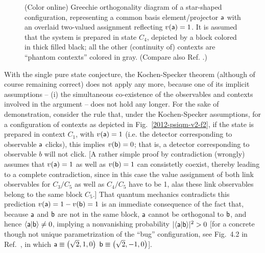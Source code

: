 \documentclass[%
  preprint,
 showpacs,
 showkeys,
 preprintnumbers,
 amsmath,amssymb,
 aps,
   pra,
  longbibliography,
 ]{revtex4-1}
\begin{document}
\begin{figure}[h]
\begin{center}
\end{center}
\caption{(Color online)
Greechie orthogonality diagram of a star-shaped configuration,
representing a common basis element/projector ${\textsf a}$ with an overlaid two-valued assignment reflecting $v({\textsf a})=1$.
It is assumed that the system is prepared in state $C_4$, depicted by a block colored in thick filled black;
all the other (continuity of) contexts are   ``phantom contexts'' colored in gray.
(Compare also Ref. \cite[Fig.~2]{2012-incomput-proofsCJ}.)
}
\label{2012-psiqm-v2}
\end{figure}



With the  single pure state conjecture,
the Kochen-Specker theorem (although of course remaining correct) does not apply any more,
because one of its implicit assumptions -- (i) the simultaneous co-existence of the observables and contexts involved in the argument --
does not hold any longer.
For the sake of demonstration, consider the rule that, under the Kochen-Specker assumptions, for a configuration
of contexts as depicted in Fig.~\ref{2012-psiqm-v2-f2},
if the state is prepared in context $C_1$, with $v({\textsf a})=1$ (i.e. the detector corresponding to observable ${\textsf a}$ clicks),
this implies $v({\textsf b})=0$; that is, a detector corresponding to observable $b$ will not click.
[A rather simple proof by contradiction (wrongly) assumes that $v({\textsf a})=1$  as well as $v({\textsf b})=1$
can consistetly coexist, thereby leading to a complete contradiction, since in this case
the value assignment of both link observables for $C_3/C_5$ as well as $C_4/C_5$ have to be  1,
alas these link observables belong to the same block $C_5$.]
That quantum mechanics contradicts this prediction  $v({\textsf a})=1-v({\textsf b})=1$ is an immediate consequence of the fact that,
because ${\textsf a}$ and ${\textsf b}$ are not in the same block, ${\textsf a}$ cannot be orthogonal to ${\textsf b}$,
and hence
$\langle {\textsf a} \vert {\textsf b} \rangle \neq 0$, implying a nonvanishing probability $\vert \langle {\textsf a} \vert {\textsf b} \rangle  \vert^2 >0$
[for a concrete though not unique parametrization of the ``bug'' configuration, see
Fig.~4.2 in Ref.~\cite{svozil-tkadlec}, in which
${\textsf a}\equiv \left(\sqrt{2},1,0\right)$
${\textsf b}\equiv \left(\sqrt{2},-1,0\right)$].
\end{document}
